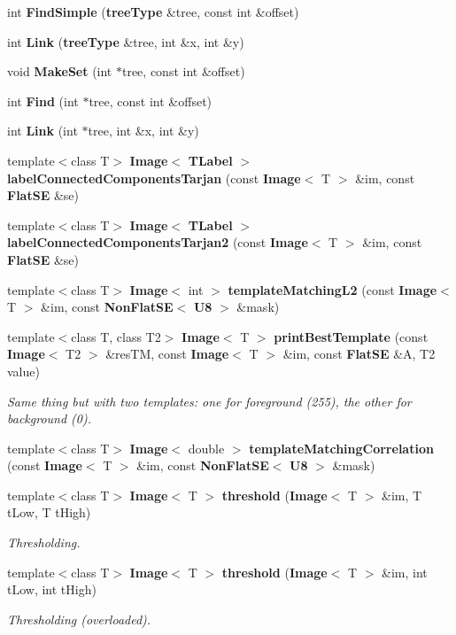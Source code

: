 \begin{CompactItemize}
int {\bf Find\-Simple} ({\bf tree\-Type} \&tree, const int \&offset)
\item 
int {\bf Link} ({\bf tree\-Type} \&tree, int \&x, int \&y)
\item 
void {\bf Make\-Set} (int $\ast$tree, const int \&offset)
\item 
int {\bf Find} (int $\ast$tree, const int \&offset)
\item 
int {\bf Link} (int $\ast$tree, int \&x, int \&y)
\item 
template$<$class T$>$ {\bf Image}$<$ {\bf TLabel} $>$ {\bf label\-Connected\-Components\-Tarjan} (const {\bf Image}$<$ T $>$ \&im, const {\bf Flat\-SE} \&se)
\item 
template$<$class T$>$ {\bf Image}$<$ {\bf TLabel} $>$ {\bf label\-Connected\-Components\-Tarjan2} (const {\bf Image}$<$ T $>$ \&im, const {\bf Flat\-SE} \&se)
\item 
template$<$class T$>$ {\bf Image}$<$ int $>$ {\bf template\-Matching\-L2} (const {\bf Image}$<$ T $>$ \&im, const {\bf Non\-Flat\-SE}$<$ {\bf U8} $>$ \&mask)
\item 
template$<$class T, class T2$>$ {\bf Image}$<$ T $>$ {\bf print\-Best\-Template} (const {\bf Image}$<$ T2 $>$ \&res\-TM, const {\bf Image}$<$ T $>$ \&im, const {\bf Flat\-SE} \&A, T2 value)
\begin{CompactList}\small\item\em Same thing but with two templates: one for foreground (255), the other for background (0). \item\end{CompactList}\item 
template$<$class T$>$ {\bf Image}$<$ double $>$ {\bf template\-Matching\-Correlation} (const {\bf Image}$<$ T $>$ \&im, const {\bf Non\-Flat\-SE}$<$ {\bf U8} $>$ \&mask)
\item 
template$<$class T$>$ {\bf Image}$<$ T $>$ {\bf threshold} ({\bf Image}$<$ T $>$ \&im, T t\-Low, T t\-High)
\begin{CompactList}\small\item\em Thresholding. \item\end{CompactList}\item 
template$<$class T$>$ {\bf Image}$<$ T $>$ {\bf threshold} ({\bf Image}$<$ T $>$ \&im, int t\-Low, int t\-High)
\begin{CompactList}\small\item\em Thresholding (overloaded). \item\end{CompactList}\item 

\end{CompactItemize}

